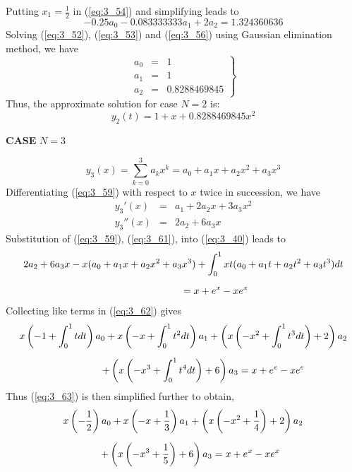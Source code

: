 \documentclass[12pt]{report}
\newcommand{\sps}{\\[0.2cm]}
\newcommand{\refn}[1]{(\ref{#1})}
\newcommand{\refx}[1]{\refn{eq:#1}}
\newcommand{\bt}[1]{\textbf{#1}}
\newcommand{\sprime}{'}
\newcommand{\dprime}{''}
\begin{document}
	Putting $x_1 = \frac{1}{2}$ in \refn{eq:3_54} and simplifying leads to
	\begin{equation}
		-0.25a_0 - 0.083333333a_1 + 2a_2 = 1.324360636 \label{eq:3_56}
	\end{equation}
	Solving \refx{3_52}, \refx{3_53} and \refx{3_56} using Gaussian elimination method, we have
	\begin{equation}
		\left. 
			\begin{array}{rcl}
				a_0 &=& 1 \sps
				a_1 &=& 1 \sps
				a_2 &=& 0.8288469845
			\end{array}
		\right\}
		\label{eq:3_57}
	\end{equation}
	Thus, the approximate solution for case $N=2$ is:
	\begin{equation}
		y_2(t) = 1 + x + 0.8288469845x^2 \label{eq:3_58}
	\end{equation}
	\begin{center}
		\large \bt{CASE} $N=3$
	\end{center}
	\begin{equation}
		y_3(x) = \sum_{k=0}^{3}a_kx^k = a_0 + a_1x + a_2x^2 + a_3x^3 \label{eq:3_59}
	\end{equation}
	Differentiating \refx{3_59} with respect to $x$ twice in succession, we have 
	\begin{eqnarray}
		y_3\sprime(x) &=&a_1 + 2a_2x + 3a_3x^2 \label{eq:3_60}\sps
		y_3\dprime(x) &=&2a_2 + 6a_3x \label{eq:3_61}
	\end{eqnarray}
	Substitution of \refx{3_59}, \refx{3_61}, into \refx{3_40} leads to
	\begin{eqnarray}
		2a_2 + 6a_3x - x(a_0 + a_1x+a_2x^2+a_3x^3) + \int_0^1 xt(a_0+a_1t + a_2t^2 + a_3t^3)dt\notag \sps
		= x + e^x - xe^x~~~~~~~~~~~~~~~~~~~~~~~~~~~~~ \label{eq:3_62}
	\end{eqnarray}
	Collecting like terms in \refx{3_62} gives 
	\begin{eqnarray}
		x\left(-1 + \int_0^1 tdt\right)a_0 + x \left(-x+\int_0^1 t^2dt\right)a_1 + \left(x \left(-x^2 + \int_0^1t^3dt\right)+2\right)a_2 \notag \sps
		+ \left(x\left(-x^3 + \int_0^1 t^4dt\right)+6\right)a_3 = x+e^e-xe^e~~~~~~~~~~~~~ \label{eq:3_63}
	\end{eqnarray}
	Thus \refx{3_63} is then simplified further to obtain,
	\begin{eqnarray}
		x\left(-\frac{1}{2}\right)a_0 + x\left(-x + \frac{1}{3}\right)a_1 + \left(x \left(-x^2 + \frac{1}{4}\right)+2\right)a_2 \notag \sps
		+ \left(x\left(-x^3 + \frac{1}{5}\right)+6\right)a_3 = x +e^x - xe^x~~~~~~~ \label{eq:3_64}
	\end{eqnarray}
\end{document}
